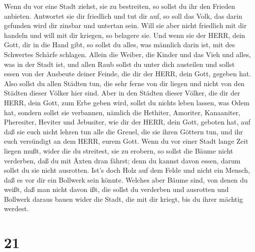  Wenn du vor eine Stadt ziehst, sie zu bestreiten, so
sollst du ihr den Frieden anbieten.  Antwortet sie dir
friedlich und tut dir auf, so soll das Volk, das darin gefunden wird dir
zinsbar und untertan sein.  Will sie aber nicht friedlich
mit dir handeln und will mit dir kriegen, so belagere sie. 
Und wenn sie der HERR, dein Gott, dir in die Hand gibt, so sollst du
alles, was männlich darin ist, mit des Schwertes Schärfe schlagen.
 Allein die Weiber, die Kinder und das Vieh und alles, was
in der Stadt ist, und allen Raub sollst du unter dich austeilen und
sollst essen von der Ausbeute deiner Feinde, die dir der HERR, dein
Gott, gegeben hat.  Also sollst du allen Städten tun, die
sehr ferne von dir liegen und nicht von den Städten dieser Völker hier
sind.  Aber in den Städten dieser Völker, die dir der HERR,
dein Gott, zum Erbe geben wird, sollst du nichts leben lassen, was Odem
hat,  sondern sollst sie verbannen, nämlich die Hethiter,
Amoriter, Kanaaniter, Pheresiter, Heviter und Jebusiter, wie dir der
HERR, dein Gott, geboten hat,  auf daß sie euch nicht
lehren tun alle die Greuel, die sie ihren Göttern tun, und ihr euch
versündigt an dem HERR, eurem Gott.  Wenn du vor einer
Stadt lange Zeit liegen mußt, wider die du streitest, sie zu erobern, so
sollst die Bäume nicht verderben, daß du mit Äxten dran fährst; denn du
kannst davon essen, darum sollst du sie nicht ausrotten. Ist's doch Holz
auf dem Felde und nicht ein Mensch, daß es vor dir ein Bollwerk sein
könnte.  Welches aber Bäume sind, von denen du weißt, daß
man nicht davon ißt, die sollst du verderben und ausrotten und Bollwerk
daraus bauen wider die Stadt, die mit dir kriegt, bis du ihrer mächtig
werdest.

\hypertarget{section-20}{%
\section{21}\label{section-20}}

